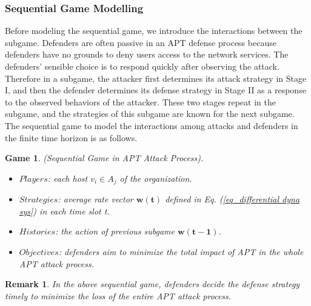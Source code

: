 \documentclass[lettersize,journal]{IEEEtran}
\newtheorem{remark}{ \textbf{Remark}}
\newtheorem{game}{ \textbf{Game}}
\begin{document}
\subsubsection{Sequential Game Modelling}
Before modeling the sequential game, we introduce the interactions between the subgame. Defenders are often passive \cite{husak2021predictive} in an APT defense process because defenders have no grounds to deny users access to the network services. The defenders' sensible choice is to respond quickly after observing the attack. Therefore in a subgame, the attacker first determines its attack strategy in Stage I, and then the defender determines its defense strategy in Stage II as a response to the observed behaviors of the attacker. These two stages repeat in the subgame, and the strategies of this subgame are known for the next subgame. The sequential game to model the interactions among attacks and defenders in the finite time horizon is as follows.
\begin{game}\label{game2}
(Sequential Game in APT Attack Process).
\begin{itemize}
        \item $Players$: each host $v_i \in A_j$ of the organization.
      \item $Strategies$: average rate vector $\bm{w(t)}$ defined in Eq. (\ref{eq_differential dyna sys}) in each time slot t.
      \item $Histories$: the action of previous subgame $\bm{w(t-1)}$.
      \item $Objectives$: defenders aim to minimize the total impact of APT in the whole APT attack process.
\end{itemize}
\end{game}
\begin{remark}
In the above sequential game, defenders decide the defense strategy timely to minimize the loss of the entire APT attack process.
\end{remark}
\par
\end{document}
